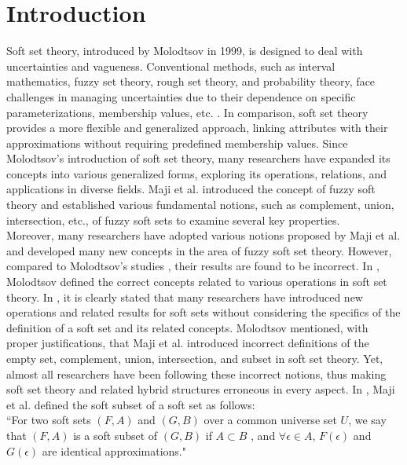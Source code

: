 \documentclass{article}
\theoremstyle{definition}
\begin{document}
\section{Introduction}
Soft set theory, introduced by Molodtsov \cite{1} in 1999, is designed to deal with uncertainties and vagueness. Conventional methods, such as interval mathematics, fuzzy set theory, rough set theory, and probability theory, face challenges in managing uncertainties due to their dependence on specific parameterizations, membership values, etc. \cite{1}. In comparison, soft set theory provides a more flexible and generalized approach, linking attributes with their approximations without requiring predefined membership values. Since Molodtsov's introduction of soft set theory, many researchers have expanded its concepts into various generalized forms, exploring its operations, relations, and applications in diverse fields. Maji et al. \cite{7} introduced the concept of fuzzy soft theory and established various fundamental notions, such as complement, union, intersection, etc., of fuzzy soft sets to examine several key properties.\\

Moreover, many researchers have adopted various notions proposed by Maji et al. \cite{7} and developed many new concepts in the area of fuzzy soft set theory. However, compared to Molodtsov's studies \cite{2,3,4,10}, their results are found to be incorrect. In \cite{3}, Molodtsov defined the correct concepts related to various operations in soft set theory. In \cite{2, 3}, it is clearly stated that many researchers have introduced new operations and related results for soft sets without considering the specifics of the definition of a soft set and its related concepts. Molodtsov \cite{2,3} mentioned, with proper justifications, that Maji et al. \cite{11} introduced incorrect definitions of the empty set, complement, union, intersection, and subset in soft set theory. Yet, almost all researchers have been following these incorrect notions, thus making soft set theory and related hybrid structures erroneous in every aspect. In \cite{7}, Maji et al. defined the soft subset of a soft set as follows:\\

``For two soft sets $(F, A)$ and $(G, B)$ over a common universe set $U$, we say that $(F, A)$ is a soft subset of $(G, B)$ if $A\subset B$ , and $\forall \epsilon \in A$, $F(\epsilon)$ and $G(\epsilon)$ are identical approximations." \\
\end{document}
